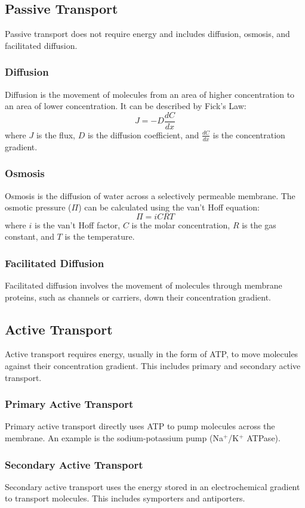 \documentclass{article}
\begin{document}
\subsection{Passive Transport}
Passive transport does not require energy and includes diffusion, osmosis, and facilitated diffusion.

\subsubsection{Diffusion}
Diffusion is the movement of molecules from an area of higher concentration to an area of lower concentration. It can be described by Fick's Law:
\[
J = -D \frac{dC}{dx}
\]
where \( J \) is the flux, \( D \) is the diffusion coefficient, and \( \frac{dC}{dx} \) is the concentration gradient.

\subsubsection{Osmosis}
Osmosis is the diffusion of water across a selectively permeable membrane. The osmotic pressure (\( \Pi \)) can be calculated using the van't Hoff equation:
\[
\Pi = iCRT
\]
where \( i \) is the van't Hoff factor, \( C \) is the molar concentration, \( R \) is the gas constant, and \( T \) is the temperature.

\subsubsection{Facilitated Diffusion}
Facilitated diffusion involves the movement of molecules through membrane proteins, such as channels or carriers, down their concentration gradient.

\subsection{Active Transport}
Active transport requires energy, usually in the form of ATP, to move molecules against their concentration gradient. This includes primary and secondary active transport.

\subsubsection{Primary Active Transport}
Primary active transport directly uses ATP to pump molecules across the membrane. An example is the sodium-potassium pump (Na\(^+\)/K\(^+\) ATPase).

\subsubsection{Secondary Active Transport}
Secondary active transport uses the energy stored in an electrochemical gradient to transport molecules. This includes symporters and antiporters.
\end{document}
